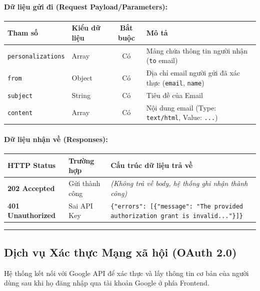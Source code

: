 \documentclass[12pt,a4paper]{article}
\begin{document}
\paragraph{Dữ liệu gửi đi (Request Payload/Parameters):}
\begin{longtable}{|>{\raggedright\arraybackslash}p{2.8cm}|>{\raggedright\arraybackslash}p{2.2cm}|c|>{\raggedright\arraybackslash}p{7.0cm}|}
\hline
\textbf{Tham số} & \textbf{Kiểu dữ liệu} & \textbf{Bắt buộc} & \textbf{Mô tả} \\ \hline
\endhead
\texttt{personalizations} & Array & Có & Mảng chứa thông tin người nhận (\texttt{to} email) \\ \hline
\texttt{from} & Object & Có & Địa chỉ email người gửi đã xác thực (\texttt{email}, \texttt{name}) \\ \hline
\texttt{subject} & String & Có & Tiêu đề của Email \\ \hline
\texttt{content} & Array & Có & Nội dung email (Type: \texttt{text/html}, Value: \texttt{...}) \\ \hline
\end{longtable}

\paragraph{Dữ liệu nhận về (Responses):}
\begin{longtable}{|>{\raggedright\arraybackslash}p{2.8cm}|>{\raggedright\arraybackslash}p{3.2cm}|>{\raggedright\arraybackslash}p{8.0cm}|}
\hline
\textbf{HTTP Status} & \textbf{Trường hợp} & \textbf{Cấu trúc dữ liệu trả về} \\ \hline
\endhead
\textbf{202 Accepted} & Gửi thành công & \textit{(Không trả về body, hệ thống ghi nhận thành công)} \\ \hline
\textbf{401 Unauthorized} & Sai API Key & \texttt{\{"errors": [\{"message": "The provided authorization grant is invalid..."\}]\}} \\ \hline
\end{longtable}

\vskip 0.4cm
\noindent\rule{\textwidth}{0.3pt}
\vskip 0.4cm

\subsection{Dịch vụ Xác thực Mạng xã hội (OAuth 2.0)}
Hệ thống kết nối với Google API để xác thực và lấy thông tin cơ bản của người dùng sau khi họ đăng nhập qua tài khoản Google ở phía Frontend.
\end{document}
